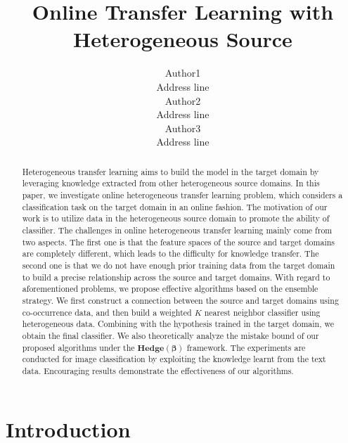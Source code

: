 \documentclass[letterpaper]{article}
\theoremstyle{remark}
\theoremstyle{definition}
\begin{document}
%
\title{Online Transfer Learning with Heterogeneous Source}
\author{Author1\\ Address line\\
\And Author2 \\ Address line\\
\And Author3 \\ Address line\\
}
\maketitle
\begin{abstract}
Heterogeneous transfer learning aims to build the model in the target domain by leveraging knowledge extracted from other heterogeneous source domains.
In this paper, we investigate online heterogeneous transfer learning problem, which considers a classification task on the target domain in an online fashion.
The motivation of our work is to utilize data in the heterogeneous source domain to promote the ability of classifier.
The challenges in online heterogeneous transfer learning mainly come from two aspects.
The first one is that the feature spaces of the source and target domains are completely different, which leads to the difficulty for knowledge transfer.
The second one is that we do not have enough prior training data from the target domain to build a precise relationship across the source and target domains.
With regard to aforementioned problems, we propose effective algorithms based on the ensemble strategy.
We first construct a connection between the source and target domains using co-occurrence data, and then build a weighted $K$ nearest neighbor classifier using heterogeneous data.
Combining with the hypothesis trained in the target domain, we obtain the final classifier.
We also theoretically analyze the mistake bound of our proposed algorithms under the $\mathbf{Hedge(\beta)}$ framework.
The experiments are conducted for image classification by exploiting the knowledge learnt from the text data.
Encouraging results demonstrate the effectiveness of our algorithms.

\end{abstract}


\section{Introduction}
\end{document}
